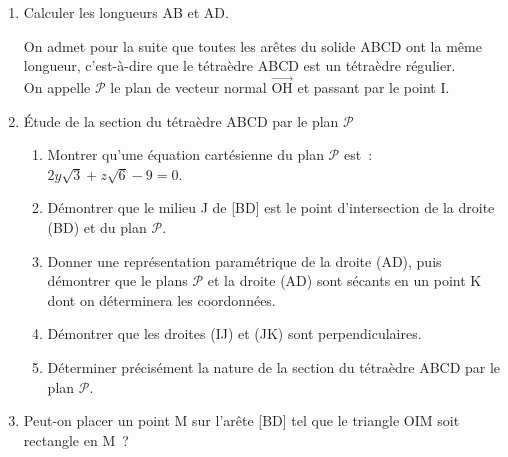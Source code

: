 \begin{enumerate}
     \item Calculer les longueurs AB et AD.
     \par
     \begin{margeneg}
          On admet pour la suite que toutes les arêtes du solide ABCD ont la même longueur, c'est-à-dire que le tétraèdre ABCD est un tétraèdre régulier.\\
          On appelle $\mathscr{P}$ le plan de vecteur normal $\overrightarrow{\text{OH}}$ et passant par le point I.
     \end{margeneg}
     \par
     \item  Étude de la section du tétraèdre ABCD par le plan $\mathscr{P}$
     \begin{enumerate}[label=\alph*.]
          \item Montrer qu'une équation cartésienne du plan $\mathscr{P}$ est~: $2y\sqrt{3} + z\sqrt{6} - 9 = 0$.
          \item Démontrer que le milieu J de [BD] est le point d'intersection de la droite (BD) et du plan $\mathscr{P}$.
          \item  Donner une représentation paramétrique de la droite (AD), puis démontrer que le plans $\mathscr{P}$ et la droite (AD) sont sécants en un point K dont on déterminera les coordonnées.
          \item  Démontrer que les droites (IJ) et (JK) sont perpendiculaires.
          \item  Déterminer précisément la nature de la section du tétraèdre ABCD par le plan $\mathscr{P}$.
     \end{enumerate}
     \item  Peut-on placer un point M sur l'arête [BD] tel que le triangle OIM soit rectangle en M~?
\end{enumerate}
